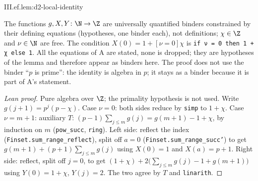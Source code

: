\begin{lemma}
\end{lemma}
\begin{tfformal}{III.ef.lem:d2-local-identity}
\begin{tffidelity}
The functions $g,X,Y\colon\N\to\Z$ are universally quantified binders constrained by their defining equations (hypotheses, one binder each), not definitions; $\chi\in\Z$ and $\nu\in\N$ are free. The condition $X(0)=1+[\nu=0]\chi$ is \texttt{if ν = 0 then 1 + χ else 1}. All the equations of A are stated, none is dropped; they are hypotheses of the lemma and therefore appear as binders here. The proof does not use the binder ``$p$ is prime'': the identity is algebra in $p$; it stays as a binder because it is part of A's statement.
\end{tffidelity}
\end{tfformal}
\begin{proof}[Lean proof]
Pure algebra over $\Z$; the primality hypothesis is not used. Write $g(j+1)=p^j(p-\chi)$. Case $\nu=0$: both sides reduce by \texttt{simp} to $1+\chi$. Case $\nu=m+1$: auxiliary $T$: $(p-1)\sum_{j\le m}g(j)=g(m+1)-1+\chi$, by induction on $m$ (\texttt{pow\_succ}, \texttt{ring}). Left side: reflect the index (\texttt{Finset.sum\_range\_reflect}), split off $a=0$ (\texttt{Finset.sum\_range\_succ'}) to get $g(m+1)+(p+1)\sum_{j\le m}g(j)$ using $X(0)=1$ and $X(a)=p+1$. Right side: reflect, split off $j=0$, to get $(1+\chi)+2\bigl(\sum_{j\le m}g(j)-1+g(m+1)\bigr)$ using $Y(0)=1+\chi$, $Y(j)=2$. The two agree by $T$ and \texttt{linarith}.
\end{proof}

